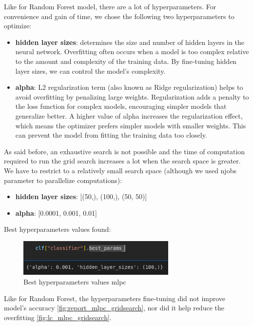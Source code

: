 \documentclass[a4paper,12pt]{article}
\begin{document}
Like for Random Forest model, there are a lot of hyperparameters. For convenience and gain of time, we chose the following two hyperparameters to optimize:

\begin{itemize}
    \item \textbf{hidden layer sizes}: determines the size and number of hidden layers in the neural network. Overfitting often occurs when a model is too complex relative to the amount and complexity of the training data. By fine-tuning hidden layer sizes, we can control the model's complexity.
    \item \textbf{alpha}: L2 regularization term (also known as Ridge regularization) helps to avoid overfitting by penalizing large weights. Regularization adds a penalty to the loss function for complex models, encouraging simpler models that generalize better. A higher value of alpha increases the regularization effect, which means the optimizer prefers simpler models with smaller weights. This can prevent the model from fitting the training data too closely.
\end{itemize}


As said before, an exhaustive search is not possible and the time of computation required to run the grid search increases a lot when the search space is greater. We have to restrict to a relatively small search space (although we used njobs parameter to parallelize computations):
\begin{itemize}
    \item \textbf{hidden layer sizes}: [(50,), (100,), (50, 50)]
    \item \textbf{alpha}: [0.0001, 0.001, 0.01]
\end{itemize}

Best hyperparameters values found:

\begin{figure}[H]
  \centering
  \includegraphics[width=0.7\textwidth]{./images/best_params_mlpc.png}
  \caption{Best hyperparameters values mlpc}
  \label{fig:best_params_mlpc}
\end{figure}

Like for Random Forest, the hyperparameters fine-tuning did not improve model’s accuracy \ref{fig:report_mlpc_gridsearch}, nor did it help reduce the overfitting \ref{fig:lc_mlpc_gridsearch}.
\end{document}
